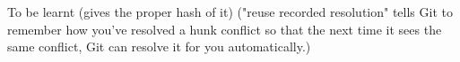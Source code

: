 \begin{frame}{To be learnt}
   (gives the proper hash of it)
   ("reuse recorded resolution" tells Git to remember how you’ve resolved a hunk conflict so that the next time it sees the same conflict, Git can resolve it for you automatically.)
\end{frame}
